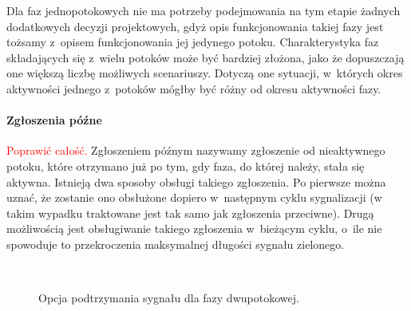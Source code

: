 \documentclass{pracamgr}
\newcommand{\todo}[1]{\textcolor{red}{#1}}
\theoremstyle{plain}
\begin{document}
Dla faz jednopotokowych nie ma potrzeby podejmowania na tym etapie
żadnych dodatkowych decyzji projektowych, gdyż opis funkcjonowania
takiej fazy jest tożsamy z~opisem funkcjonowania jej jedynego
potoku. Charakterystyka faz składających się z~wielu potoków może być
bardziej złożona, jako że dopuszczają one większą liczbę możliwych
scenariuszy. Dotyczą one sytuacji, w~których okres aktywności jednego
z~potoków mógłby być różny od okresu aktywności fazy.

\paragraph{Zgłoszenia późne} \todo{Poprawić całość.} Zgłoszeniem
późnym nazywamy zgłoszenie od nieaktywnego potoku, które otrzymano już
po tym, gdy faza, do której należy, stała się aktywna. Istnieją dwa
sposoby obsługi takiego zgłoszenia. Po pierwsze można uznać, że
zostanie ono obsłużone dopiero w~następnym cyklu sygnalizacji (w takim
wypadku traktowane jest tak samo jak zgłoszenia przeciwne). Drugą
możliwością jest obsługiwanie takiego zgłoszenia w~bieżącym cyklu,
o~ile nie spowoduje to przekroczenia maksymalnej długości sygnału
zielonego.
\begin{figure}
  \centering
  \\\vspace{0.5cm}
  \caption{Opcja podtrzymania sygnału dla fazy dwupotokowej.}
\end{figure}
\end{document}
